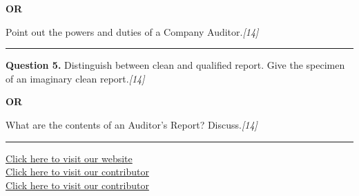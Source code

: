 \documentclass[11pt,a4paper]{article}
\newcommand{\pts}[1]{\hfill   \textit{[#1]}}
\begin{document}
\centerline{   \textbf{OR}}

Point out the powers and duties of a Company Auditor.\pts{14}

\medskip\rule{\linewidth}{0.2pt}




\noindent   \textbf{Question 5.}
Distinguish between clean and qualified report. Give the specimen of an imaginary clean report.\pts{14}

\centerline{   \textbf{OR}}

What are the contents of an Auditor's Report? Discuss.\pts{14}

\vfill
\rule{\linewidth}{0.4pt}

\begin{center}\small
\href{https://bhu-exam.vercel.app/}{Click here to visit our website}\\[4pt]
\href{https://me-aryan.vercel.app/}{Click here to visit our contributor}\\[4pt]
\href{https://quashan-me.vercel.app/}{Click here to visit our contributor}
\end{center}
\end{document}
